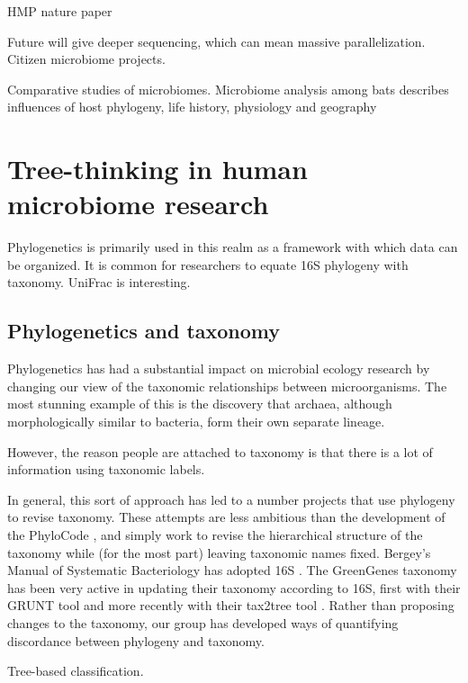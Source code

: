 \documentclass{amsart}
\begin{document}
HMP nature paper
\cite{methe2012framework}

Future will give deeper sequencing, which can mean massive parallelization.
Citizen microbiome projects.

Comparative studies of microbiomes.
\cite{phillips2012microbiome}
Microbiome analysis among bats describes influences of host phylogeny, life history, physiology and geography



\section{Tree-thinking in human microbiome research}

Phylogenetics is primarily used in this realm as a framework with which data can be organized.
It is common for researchers to equate 16S phylogeny with taxonomy.
UniFrac is interesting.

\subsection{Phylogenetics and taxonomy}

Phylogenetics has had a substantial impact on microbial ecology research by changing our view of the taxonomic relationships between microorganisms.
The most stunning example of this is the discovery that archaea, although morphologically similar to bacteria, form their own separate lineage.

However, the reason people are attached to taxonomy is that there is a lot of information using taxonomic labels.

In general, this sort of approach has led to a number projects that use phylogeny to revise taxonomy.
These attempts are less ambitious than the development of the PhyloCode \cite{forey2001phylocode}, and simply work to revise the hierarchical structure of the taxonomy while (for the most part) leaving taxonomic names fixed.
Bergey's Manual of Systematic Bacteriology has adopted 16S \cite{kreig1984bergey}.
The GreenGenes taxonomy \cite{desantis2006greengenes} has been very active in updating their taxonomy according to 16S, first with their GRUNT tool \cite{dalevi2007automated} and more recently with their tax2tree tool \cite{mcdonald2011improved}.
Rather than proposing changes to the taxonomy, our group \cite{matsen2011reconciling} has developed ways of quantifying discordance between phylogeny and taxonomy.

Tree-based classification.
\cite{bazinet2012comparative}
\end{document}
